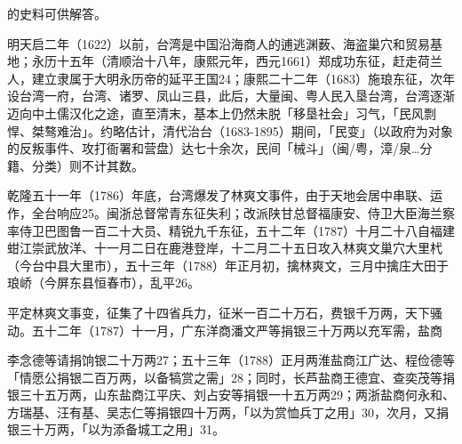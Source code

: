 \vfill
\begin{BookNotes}
\end{BookNotes}

\noindent 的史料可供解答。


明天启二年（1622）以前，台湾是中国沿海商人的逋逃渊薮、海盗巢穴和贸易基地；永历十五年（清顺治十八年，康熙元年，西元1661）郑成功东征，赶走荷兰人，建立隶属于大明永历帝的延平王国24；康熙二十二年（1683）施琅东征，次年设台湾一府，台湾、诸罗、凤山三县，此后，大量闽、粤人民入垦台湾，台湾逐渐迈向中土儒汉化之途，直至清末，基本上仍然未脱「移垦社会」习气，「民风剽悍、桀骜难治」。约略估计，清代治台（1683-1895）期间，「民变」（以政府为对象的反叛事件、攻打衙署和营盘）达七十余次，民间「械斗」（闽/粤，漳/泉…分籍、分类）则不计其数。

乾隆五十一年（1786）年底，台湾爆发了林爽文事件，由于天地会居中串联、运作，全台响应25。闽浙总督常青东征失利；改派陕甘总督福康安、侍卫大臣海兰察率侍卫巴图鲁一百二十大员、精锐九千东征，五十二年（1787）十月二十八自福建蚶江崇武放洋、十一月二日在鹿港登岸，十二月二十五日攻入林爽文巢穴大里杙（今台中县大里市），五十三年（1788）年正月初，擒林爽文，三月中擒庄大田于琅峤（今屏东县恒春市），乱平26。

平定林爽文事变，征集了十四省兵力，征米一百二十万石，费银千万两，天下骚动。五十二年（1787）十一月，广东洋商潘文严等捐银三十万两以充军需，盐商

\vfill
\begin{BookNotes}
\end{BookNotes}

\noindent 李念德等请捐饷银二十万两27；五十三年（1788）正月两淮盐商江广达、程俭德等「情愿公捐银二百万两，以备犒赏之需」28；同时，长芦盐商王德宜、查奕茂等捐银三十五万两，山东盐商江平庆、刘占安等捐银一十五万两29；两浙盐商何永和、方瑞基、汪有基、吴志仁等捐银四十万两，「以为赏恤兵丁之用」30，次月，又捐银三十万两，「以为添备城工之用」31。

